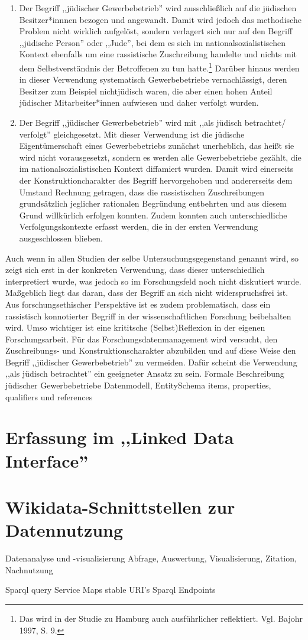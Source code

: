 \begin{enumerate}
    \item Der Begriff ,,jüdischer Gewerbebetrieb'' wird ausschließlich auf die jüdischen Besitzer*innnen bezogen und angewandt. Damit wird jedoch das methodische Problem nicht wirklich aufgelöst, sondern verlagert sich nur auf den Begriff ,,jüdische Person'' oder ,,Jude'', bei dem es sich im nationalsozialistischen Kontext ebenfalls um eine rassistische Zuschreibung handelte und nichts mit dem Selbstverständnis der Betroffenen zu tun hatte.\footnote{Das wird in der Studie zu Hamburg auch ausführlicher reflektiert. Vgl. Bajohr 1997, S. 9.} Darüber hinaus werden in dieser Verwendung systematisch Gewerbebetriebe vernachlässigt, deren Besitzer zum Beispiel nichtjüdisch waren, die aber einen hohen Anteil jüdischer Mitarbeiter*innen aufwiesen und daher verfolgt wurden. 
    \item Der Begriff ,,jüdischer Gewerbebetrieb'' wird mit ,,als jüdisch betrachtet/ verfolgt'' gleichgesetzt. Mit dieser Verwendung ist die jüdische Eigentümerschaft eines Gewerbebetriebs zunächst unerheblich, das heißt sie wird nicht vorausgesetzt, sondern es werden alle Gewerbebetriebe gezählt, die im nationalsozialistischen Kontext diffamiert wurden. Damit wird einerseits der Konstruktioncharakter des Begriff hervorgehoben und andererseits dem Umstand Rechnung getragen, dass die rassistischen Zuschreibungen grundsätzlich jeglicher rationalen Begründung entbehrten und aus diesem Grund willkürlich erfolgen konnten. Zudem konnten auch unterschiedliche Verfolgungskontexte erfasst werden, die in der ersten Verwendung ausgeschlossen blieben.
\end{enumerate}

Auch wenn in allen Studien der selbe Untersuchungsgegenstand genannt wird, so zeigt sich erst in der konkreten Verwendung, dass dieser unterschiedlich interpretiert wurde, was jedoch so im Forschungsfeld noch nicht diskutiert wurde. Maßgeblich liegt das daran, dass der Begriff an sich nicht widerspruchsfrei ist. Aus forschungsethischer Perspektive ist es zudem problematisch, dass ein rassistisch konnotierter Begriff in der wissenschaftlichen Forschung beibehalten wird. Umso wichtiger ist eine krititsche (Selbst)Reflexion in der eigenen Forschungsarbeit. Für das Forschungsdatenmanagement wird versucht, den Zuschreibungs- und Konstruktionscharakter abzubilden und auf diese Weise den Begriff ,,jüdischer Gewerbebetrieb'' zu vermeiden. Dafür scheint die Verwendung ,,als jüdisch betrachtet'' ein geeigneter Ansatz zu sein.
Formale Beschreibung jüdischer Gewerbebetriebe Datenmodell, 
EntitySchema items, properties, qualifiers und references
\section{Erfassung im ,,Linked Data Interface''}

\section{Wikidata-Schnittstellen zur Datennutzung}
Datenanalyse und -visualisierung
Abfrage, Auswertung, Visualisierung, Zitation, Nachnutzung

Sparql query Service
Maps
stable URI's
Sparql Endpoints
